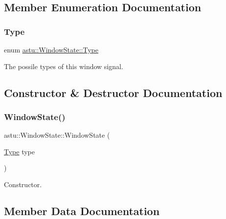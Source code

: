\subsection{Member Enumeration Documentation}
\mbox{\label{classastu_1_1WindowState_ae7ebaae8631a7957bd576aabc3914036}} 
\subsubsection{\texorpdfstring{Type}{Type}}
{\footnotesize\ttfamily enum \hyperlink{classastu_1_1WindowState_ae7ebaae8631a7957bd576aabc3914036}{astu\+::\+Window\+State\+::\+Type}\hspace{0.3cm}{\ttfamily [strong]}}

The possile types of this window signal. 

\subsection{Constructor \& Destructor Documentation}
\mbox{\label{classastu_1_1WindowState_ad6abadc59ec82b5846166138448edbf9}} 
\subsubsection{\texorpdfstring{Window\+State()}{WindowState()}}
{\footnotesize\ttfamily astu\+::\+Window\+State\+::\+Window\+State (\begin{DoxyParamCaption}\item[{\hyperlink{classastu_1_1WindowState_ae7ebaae8631a7957bd576aabc3914036}{Type}}]{type }\end{DoxyParamCaption})\hspace{0.3cm}{\ttfamily [inline]}}

Constructor. 

\subsection{Member Data Documentation}
\mbox{\label{classastu_1_1WindowState_a41b05b74477652065da5008633249307}} 
